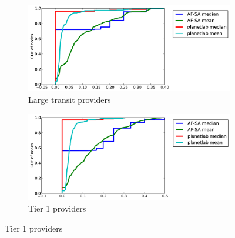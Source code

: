 \documentclass{sig-alternate-10pt}
\begin{document}
\begin{figure}
\centering
\begin{subfigure}[b]{0.45\textwidth}
\centering
    \includegraphics[width=1.0\linewidth]{figs/fractions_of_types-ltp.pdf}
    \caption{Large transit providers}
\end{subfigure}
\begin{subfigure}[b]{0.45\textwidth}
\centering
    \includegraphics[width=1.0\linewidth]{figs/fractions_of_types-tier1.pdf}
    \caption{Tier 1 providers}
\end{subfigure}


\end{figure}
\end{document}
